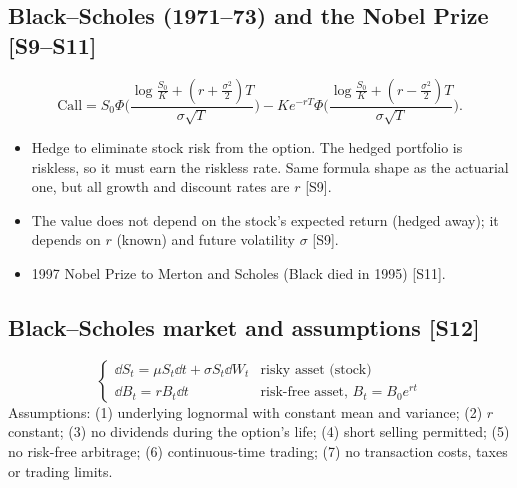 \documentclass[10pt]{article}
\begin{document}
\subsection{Black--Scholes (1971--73) and the Nobel Prize [S9--S11]}
\[\text{Call}=S_0\Phi\bigg(\frac{\log\frac{S_0}{K}+(r+\frac{\sigma^2}{2})T}{\sigma\sqrt T}\bigg)-Ke^{-rT}\Phi\bigg(\frac{\log\frac{S_0}{K}+(r-\frac{\sigma^2}{2})T}{\sigma\sqrt T}\bigg).\]
\begin{itemize}
\item Hedge to eliminate stock risk from the option. The hedged portfolio is riskless, so it must earn the riskless rate. Same formula shape as the actuarial one, but all growth and discount rates are $r$ [S9].
\item The value does not depend on the stock's expected return (hedged away); it depends on $r$ (known) and future volatility $\sigma$ [S9].
\item 1997 Nobel Prize to Merton and Scholes (Black died in 1995) [S11].
\end{itemize}

\subsection{Black--Scholes market and assumptions [S12]}
\[\begin{cases}\dd S_t=\mu S_t\dd t+\sigma S_t\dd W_t & \text{risky asset (stock)}\\ \dd B_t=rB_t\dd t & \text{risk-free asset, }B_t=B_0e^{rt}\end{cases}\]
Assumptions: (1) underlying lognormal with constant mean and variance; (2) $r$ constant; (3) no dividends during the option's life; (4) short selling permitted; (5) no risk-free arbitrage; (6) continuous-time trading; (7) no transaction costs, taxes or trading limits.
\end{document}
